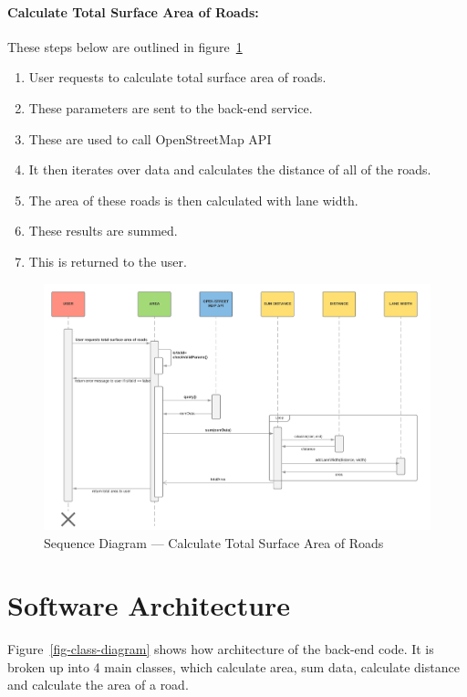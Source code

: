\documentclass[a4paper,11pt]{article}
\begin{document}
\paragraph{Calculate Total Surface Area of Roads:}

These steps below are outlined in figure~\ref{fig:seq-total-area-roads}

\begin{enumerate}
  \item User requests to calculate total surface area of roads.
  \item These parameters are sent to the back-end service.
  \item These are used to call OpenStreetMap API
  \item It then iterates over data and calculates the distance of all of the
    roads.
  \item The area of these roads is then calculated with lane width.
  \item These results are summed.
  \item This is returned to the user.
\end{enumerate}

\begin{figure}[H]
  \includegraphics[width=\textwidth]{sequence-diagram-calculate-total-surface-area-of-roads}
  \caption{Sequence Diagram --- Calculate Total Surface Area of
  Roads}\label{fig:seq-total-area-roads}
\end{figure}

\section{Software Architecture}

Figure~\ref{fig-class-diagram} shows how architecture of the back-end code. It
is broken up into 4 main classes, which calculate area, sum data, calculate
distance and calculate the area of a road.
\end{document}
